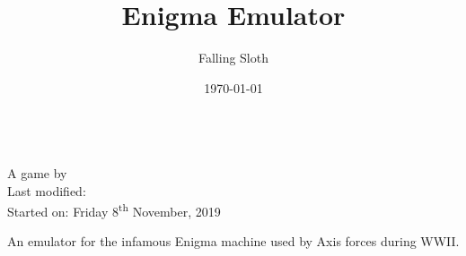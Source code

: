 \documentclass[12pt,a4paper]{article}
\title{Enigma Emulator}
\author{Falling Sloth}
\date{\today}
\begin{document}

\begin{titlepage}
	\vspace*{\fill}
	\centering
	{\Large \thetitle}\\[.5cm]
	{\large A game by \theauthor}\\[.25cm]
	{Last modified: \thedate}\\
	{\small Started on: Friday 8\textsuperscript{th} November, 2019}
	\vspace*{\fill}
\end{titlepage}

\tableofcontents
\pagebreak

\lfoot{\theauthor}\cfoot{\thetitle}

An emulator for the infamous Enigma machine used by Axis forces during WWII.


\end{document}
